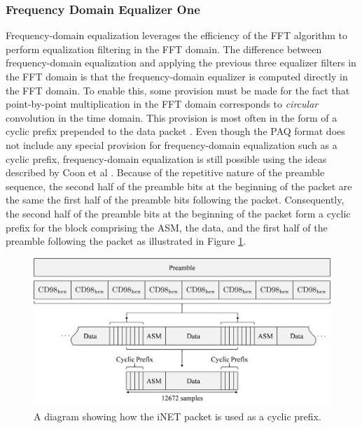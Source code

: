 \subsubsection{Frequency Domain Equalizer One}
Frequency-domain equalization leverages the efficiency of the FFT algorithm to perform equalization filtering in the FFT domain.
The difference between frequency-domain equalization and applying the previous three equalizer filters in the FFT domain is that the frequency-domain equalizer is computed directly in the FFT domain.
To enable this, some provision must be made for the fact that point-by-point multiplication in the FFT domain corresponds to \textit{circular} convolution in the time domain.
This provision is most often in the form of a cyclic prefix prepended to the data packet \cite{sari1994frequency,ng2007turbo,al2008single,proakis-salehi:2008}.
Even though the PAQ format does not include any special provision for frequency-domain equalization such as a cyclic prefix, frequency-domain equalization is still possible using the ideas described by Coon et al \cite{coon-sandell-beach-mcgeehan:2006}.
Because of the repetitive nature of the preamble sequence, the second half of the preamble bits at the beginning of the packet are the same the first half of the preamble bits following the packet.
Consequently, the second half of the preamble bits at the beginning of the packet form a cyclic prefix for the block comprising the ASM, the data, and the first half of the preamble following the packet as illustrated in Figure \ref{fig:cyclicPrefix_MDR}.
\begin{figure}
	\centering\includegraphics[width=9.47in/100*55]{figures/eq_equations/cyclicPrefix.pdf}
	\caption{A diagram showing how the iNET packet is used as a cyclic prefix.}
	\label{fig:cyclicPrefix_MDR}
\end{figure}


